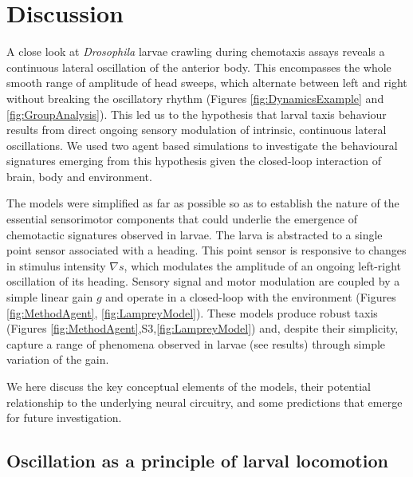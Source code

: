 \documentclass[11pt,a4paper]{article}
\newcommand{\Dros }{\emph{Drosophila }}
\newcommand{\todoBW}[1]{\todo[author=BW,color=orange, size=\tiny,inline]{#1}}
\begin{document}
\section{Discussion}
A close look at \Dros larvae crawling during chemotaxis assays reveals a continuous lateral oscillation of the anterior body. This encompasses the whole smooth range of amplitude of head sweeps, which alternate between left and right without breaking the oscillatory rhythm (Figures \ref{fig:DynamicsExample} and \ref{fig:GroupAnalysis}). 
This led us to the hypothesis that larval taxis behaviour results from direct ongoing sensory modulation of intrinsic, continuous lateral oscillations. We used two agent based simulations to investigate the behavioural signatures emerging from this hypothesis given the closed-loop interaction of brain, body and environment.
 
The models were simplified as far as possible so as to establish the nature of the essential sensorimotor components that could underlie the emergence of chemotactic signatures observed in larvae.
The larva is abstracted to a single point sensor associated with a heading. This point sensor is responsive to changes in stimulus intensity $\nabla s$, which modulates the amplitude of an ongoing left-right oscillation of its heading. Sensory signal and motor modulation are coupled by a simple linear gain $g$ and operate in a closed-loop with the environment (Figures \ref{fig:MethodAgent}, \ref{fig:LampreyModel}). 
These models produce robust taxis (Figures \ref{fig:MethodAgent},S3,\ref{fig:LampreyModel}) and, despite their simplicity, capture a range of phenomena observed in larvae (see results) through simple variation of the gain.

 We here discuss the key conceptual elements of the models, their potential relationship to the underlying neural circuitry, and some predictions that emerge for future investigation.


\subsection{Oscillation as a principle of larval locomotion}
\end{document}
